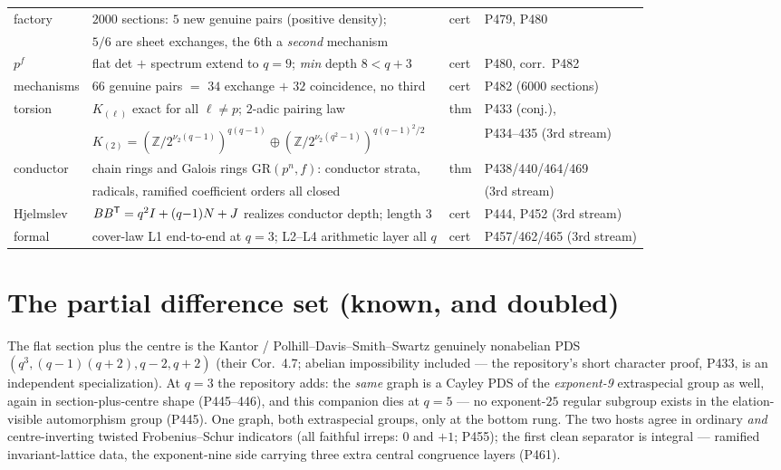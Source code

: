 \documentclass[11pt]{article}
\newcommand{\ZZ}{\mathbb Z}
\begin{document}
\begin{center}
\begin{tabular}{@{}llll@{}}
factory & $2000$ sections: $5$ new genuine pairs (positive density); & cert & P479, P480 \\
        & $5/6$ are sheet exchanges, the $6$th a \emph{second} mechanism & & \\
$p^f$ & flat det $+$ spectrum extend to $q{=}9$; \emph{min} depth $8<q{+}3$ & cert & P480, corr.\ P482 \\
mechanisms & $66$ genuine pairs $=$ $34$ exchange $+$ $32$ coincidence, no third & cert & P482 ($6000$ sections) \\
torsion & $K_{(\ell)}$ exact for all $\ell\neq p$; $2$-adic pairing law & thm & P433 (conj.), \\
        & $K_{(2)}=(\ZZ/2^{\nu_2(q-1)})^{q(q-1)}\oplus(\ZZ/2^{\nu_2(q^2-1)})^{q(q-1)^2/2}$ & & P434--435 (3rd stream) \\
conductor & chain rings and Galois rings $\mathrm{GR}(p^n,f)$: conductor strata, & thm & P438/440/464/469 \\
          & radicals, ramified coefficient orders all closed & & (3rd stream) \\
Hjelmslev & $BB^{\sf T}=q^2I+(q{-}1)N+J$ realizes conductor depth; length $3$ & cert & P444, P452 (3rd stream) \\
formal & cover-law L1 end-to-end at $q{=}3$; L2--L4 arithmetic layer all $q$ & cert & P457/462/465 (3rd stream) \\
\bottomrule
\end{tabular}
\end{center}

\section{The partial difference set (known, and doubled)}

The flat section plus the centre is the Kantor /
Polhill--Davis--Smith--Swartz genuinely nonabelian PDS
$(q^3,(q{-}1)(q{+}2),q{-}2,q{+}2)$ (their Cor.~4.7; abelian impossibility
included --- the repository's short character proof, P433, is an independent
specialization). At $q=3$ the repository adds: the \emph{same} graph is a
Cayley PDS of the \emph{exponent-9} extraspecial group as well, again in
section-plus-centre shape (P445--446), and this companion dies at $q=5$ ---
no exponent-$25$ regular subgroup exists in the elation-visible automorphism
group (P445). One graph, both extraspecial groups, only at the bottom rung.
The two hosts agree in ordinary \emph{and} centre-inverting twisted
Frobenius--Schur indicators (all faithful irreps: $0$ and $+1$; P455); the
first clean separator is integral --- ramified invariant-lattice data, the
exponent-nine side carrying three extra central congruence layers (P461).
\end{document}
